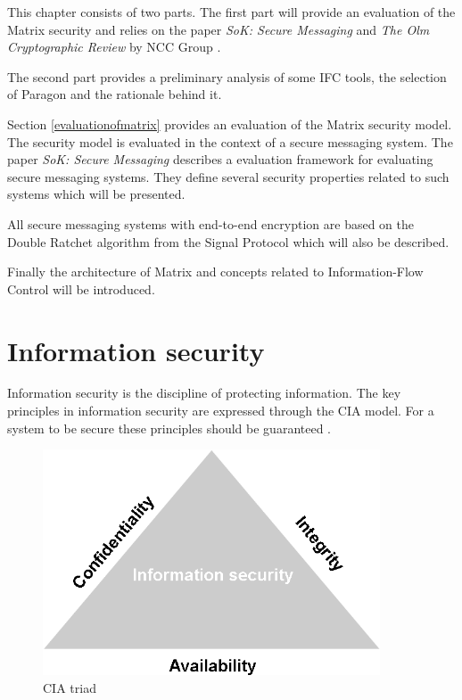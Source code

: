 
This chapter consists of two parts. The first part will provide an evaluation of the Matrix security and relies on the paper \emph{SoK: Secure Messaging} \cite{sok} and \emph{The Olm Cryptographic Review} by NCC Group \cite{ncc}. 

The second part provides a preliminary analysis of some IFC tools, the selection of Paragon and the rationale behind it.



Section \ref{evaluationofmatrix} provides an evaluation of the Matrix security model. The security model is evaluated in the context of a secure messaging system.  
The paper \emph{SoK: Secure Messaging} describes a evaluation framework for evaluating secure messaging systems. They define several security properties related to such systems \cite{sok} which will be presented.


All secure messaging systems with end-to-end encryption are based on the Double Ratchet algorithm from the Signal Protocol which will also be described.


Finally the architecture of Matrix and concepts related to Information-Flow Control will be introduced.

\section{Information security}

Information security is the discipline of protecting information. The key principles in information security are expressed through the CIA model. For a system to be secure these principles should be guaranteed \cite{michael2012}.

\begin{figure}[H]
	\centering
	\includegraphics[width=10cm]{figures/cia.png}
	\caption{CIA triad}
	\label{fig:CIA triad}
\end{figure}


